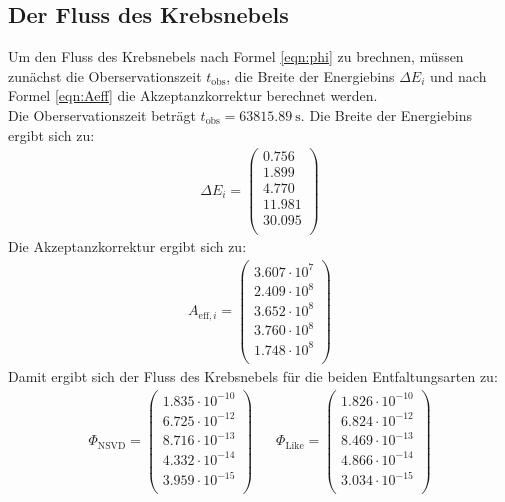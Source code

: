 \subsection{Der Fluss des Krebsnebels}
Um den Fluss des Krebsnebels nach Formel \eqref{eqn:phi} zu brechnen, müssen zunächst die Oberservationszeit $t_{\text{obs}}$, die Breite der Energiebins $\Delta E_{i}$ und nach Formel \eqref{eqn:Aeff} die Akzeptanzkorrektur berechnet werden.\\
Die Oberservationszeit beträgt $t_{\text{obs}} = \SI{63815.89}{\second}$. Die Breite der Energiebins ergibt sich zu:\\
\begin{align*}
	\Delta E_{i} = \begin{pmatrix}
			0.756\\
			1.899\\
			4.770\\
			11.981\\
			30.095\\
	\end{pmatrix}
\end{align*}
Die Akzeptanzkorrektur ergibt sich zu:
\begin{align*}
	A_{\text{eff},i} = \begin{pmatrix}
			3.607\cdot10^{7}\\
			2.409\cdot10^{8}\\
			3.652\cdot10^{8}\\
			3.760\cdot10^{8}\\
			1.748\cdot10^{8}\\
	\end{pmatrix}
\end{align*}
Damit ergibt sich der Fluss des Krebsnebels für die beiden Entfaltungsarten zu:
\begin{align*}
	\Phi_{\text{NSVD}} = \begin{pmatrix}
			1.835\cdot10^{-10}\\
			6.725\cdot10^{-12}\\
			8.716\cdot10^{-13}\\
			4.332\cdot10^{-14}\\
			3.959\cdot10^{-15}\\
	 \end{pmatrix} &\;\;\; \Phi_{\text{Like}}  = \begin{pmatrix}
				1.826\cdot10^{-10}\\
				6.824\cdot10^{-12}\\
				8.469\cdot10^{-13}\\
				4.866\cdot10^{-14}\\
				3.034\cdot10^{-15}\\
		\end{pmatrix}
\end{align*}
